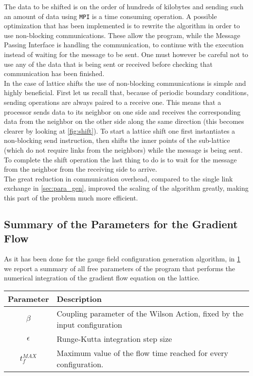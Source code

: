 The data to be shifted is on the order of hundreds of kilobytes and sending such an amount of data using \texttt{MPI} is a time consuming operation. A possible optimization that has been implemented is to rewrite the algorithm in order to use non-blocking communications. These allow the program, while the Message Passing Interface is handling the communication, to continue with the execution instead of waiting for the message to be sent. One must however be careful not to use any of the data that is being sent or received before checking that communication has been finished. \\
In the case of lattice shifts the use of non-blocking communications is simple and highly beneficial. 
First let us recall that, because of periodic boundary conditions, sending operations are always paired to a receive one. This means that a processor sends data to its neighbor on one side and receives the corresponding data from the neighbor on the other side along the same direction (this becomes clearer by looking at \cref{fig:shift}). To start a lattice shift one first instantiates a non-blocking send instruction, then shifts the inner points of the sub-lattice (which do not require links from the neighbors) while the message is being sent. To complete the shift operation the last thing to do is to wait for the message from the neighbor from the receiving side to arrive.\\
The great reduction in communication overhead, compared to the single link exchange in \cref{sec:para_gen}, improved the scaling of the algorithm greatly, making this part of the problem much more efficient.

\subsection{Summary of the Parameters for the Gradient Flow}
As it has been done for the gauge field configuration generation algorithm, in \cref{FLOW:params} we report a summary of all free parameters of the program that performs the numerical integration of the gradient flow equation on the lattice.

\begin{table}[!htb]
\begin{center}
\begin{tabular}{cl}
    Parameter & Description\\\hline
    $\beta$ & Coupling parameter of the Wilson Action, fixed by the input configuration\\
    $\epsilon$ & Runge-Kutta integration step size\\
    $t_f^{MAX}$ & Maximum value of the flow time reached for every configuration. 
\end{tabular}
\label{FLOW:params}
\end{center}
\end{table} 


